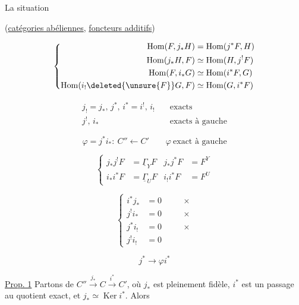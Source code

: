 


La situation

(\uline{catégories abéliennes}, \uline{foncteurs additifs})

\[
\left\{\begin{aligned}
\operatorname{Hom}(F,j_*H)&=\operatorname{Hom}(j^*F,H)\\
\operatorname{Hom}(j_*H,F)&\simeq\operatorname{Hom}(H,j^!F)\\
\operatorname{Hom}(F,i_*G)&\simeq\operatorname{Hom}(i^*F,G)\\
\operatorname{Hom}(i_!\deleted{\unsure{F}}G,F)&\simeq\operatorname{Hom}(G,i^*F)
\end{aligned}\right.
\]

\[
\begin{aligned}
j_!=j_*,\,j^*,\,i^*=i^!,\,i_!&\quad\text{exacts}\\
j^!,\,i_*&\quad\text{exacts à gauche}
\end{aligned}
\]

\[
\varphi=j^*i_*:\ C''\longleftarrow C'\qquad\varphi\ \text{exact à gauche}
\]

\[
\left\{\begin{aligned}
j_*j^!F&=\underline{\Gamma}_Y F& j_*j^*F&=F^Y\\
i_*i^*F&=\underline{\Gamma}_U F& i_!i^*F&=F^U
\end{aligned}\right.
\]

\[
\left\{\begin{aligned}
i^*j_*&=0&\quad &\times\\
j^!i_*&=0&&\times\\
j^*i_!&=0&&\times\\
j^!i_!&=0
\end{aligned}\right.
\]

\[
j^*\longrightarrow\varphi i^*
\]

\uline{Prop. 1} Partons de $C''\xrightarrow{j_*}C\xrightarrow{i^*}C'$, où $j_*$ est pleinement fidèle, $i^*$ est un passage au quotient exact, et $j_*\simeq\operatorname{Ker}i^*$.  Alors


